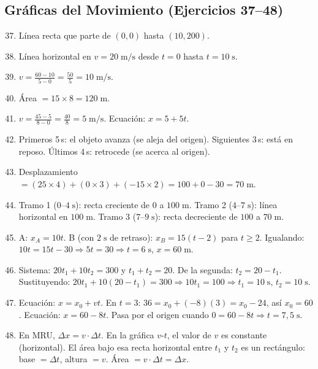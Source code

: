 \documentclass[12pt, letterpaper]{article}
\begin{document}
  \subsection*{Gráficas del Movimiento (Ejercicios 37--48)}

  \begin{enumerate}[leftmargin=*, label=\textbf{\arabic*.}]
    \setcounter{enumi}{36}
    \item Línea recta que parte de $(0, 0)$ hasta $(10, 200)$.

    \item Línea horizontal en $v = 20\;\text{m/s}$ desde $t = 0$ hasta $t = 10\;\text{s}$.

    \item $v = \frac{60 - 10}{5 - 0} = \frac{50}{5} = 10\;\text{m/s}$.

    \item Área $= 15 \times 8 = 120\;\text{m}$.

    \item $v = \frac{45 - 5}{8 - 0} = \frac{40}{8} = 5\;\text{m/s}$. Ecuación: $x = 5 + 5t$.

    \item Primeros 5\,s: el objeto avanza (se aleja del origen). Siguientes 3\,s: está en reposo. Últimos 4\,s: retrocede (se acerca al origen).

    \item Desplazamiento $= (25 \times 4) + (0 \times 3) + (-15 \times 2) = 100 + 0 - 30 = 70\;\text{m}$.

    \item Tramo 1 ($0$–$4\;\text{s}$): recta creciente de $0$ a $100\;\text{m}$. Tramo 2 ($4$–$7\;\text{s}$): línea horizontal en $100\;\text{m}$. Tramo 3 ($7$–$9\;\text{s}$): recta decreciente de $100$ a $70\;\text{m}$.

    \item A: $x_A = 10t$. B (con $2\;\text{s}$ de retraso): $x_B = 15(t - 2)$ para $t \geq 2$. Igualando: $10t = 15t - 30 \Rightarrow 5t = 30 \Rightarrow t = 6\;\text{s}$, $x = 60\;\text{m}$.

    \item Sistema: $20t_1 + 10t_2 = 300$ y $t_1 + t_2 = 20$. De la segunda: $t_2 = 20 - t_1$. Sustituyendo: $20t_1 + 10(20 - t_1) = 300 \Rightarrow 10t_1 = 100 \Rightarrow t_1 = 10\;\text{s}$, $t_2 = 10\;\text{s}$.

    \item Ecuación: $x = x_0 + vt$. En $t = 3$: $36 = x_0 + (-8)(3) = x_0 - 24$, así $x_0 = 60$. Ecuación: $x = 60 - 8t$. Pasa por el origen cuando $0 = 60 - 8t \Rightarrow t = 7{,}5\;\text{s}$.

    \item En MRU, $\Delta x = v \cdot \Delta t$. En la gráfica $v$-$t$, el valor de $v$ es constante (horizontal). El área bajo esa recta horizontal entre $t_1$ y $t_2$ es un rectángulo: base $= \Delta t$, altura $= v$. Área $= v \cdot \Delta t = \Delta x$.
  \end{enumerate}

\fi
\end{document}
